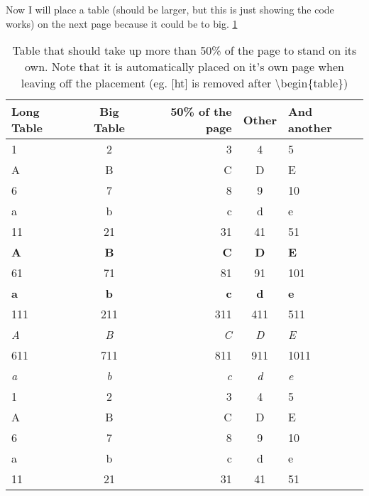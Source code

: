 Now I will place a table (should be larger, but this is just showing the code works) on the next page because it could be to big. \ref{tab:my_labelTable}


\begin{table}
    \centering
    \caption{Table that should take up more than 50\% of the page to stand on its own. Note that it is automatically placed on it's own page when leaving off the placement (eg. [ht] is removed after \textbackslash begin\{table\})}
    \label{tab:my_labelTable}
\begin{tabular}{lcrcl}
\hline \T\B
Long Table & Big Table & 50\% of the page & Other & And another \\ \hline
1          & 2         & 3                & 4          & 5           \\
A          & B         & C                & D          & E           \\
6          & 7         & 8                & 9          & 10          \\
a          & b         & c                & d          & e          \\
11         & 21        & 31               & 41         & 51          \\
\textbf{A} & \textbf{B}& \textbf{C}       & \textbf{D} & \textbf{E}  \\
61         & 71        & 81               & 91         & 101         \\
\textbf{a} & \textbf{b}& \textbf{c}       & \textbf{d} & \textbf{e} \\
111        & 211       & 311              & 411        & 511         \\
\textit{A} & \textit{B}& \textit{C}       & \textit{D} & \textit{E}  \\
611        & 711       & 811              & 911        & 1011        \\
\textit{a} & \textit{b}& \textit{c}       & \textit{d} & \textit{e}  \\
1          & 2         & 3                & 4          & 5           \\
A          & B         & C                & D          & E           \\
6          & 7         & 8                & 9          & 10          \\
a          & b         & c                & d          & e          \\
11         & 21        & 31               & 41         & 51          \\

\end{tabular}
\end{table}
